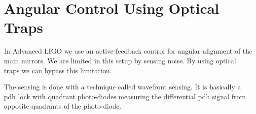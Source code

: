 
\section{Angular Control Using Optical Traps}

In Advanced LIGO we use an active feedback control for angular alignment of
the main mirrors.
We are limited in this setup by sensing noise.
By using optical traps we can bypass this limitation.

The sensing is done with a technique called wavefront sensing.
It is basically a \ac{pdh} lock with quadrant photo-diodes measuring
the differential \ac{pdh} signal from opposite quadrants of the photo-diode.


